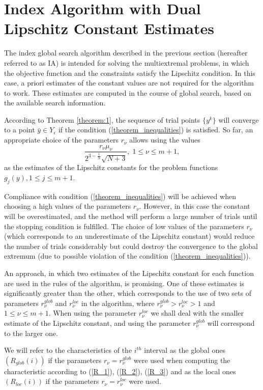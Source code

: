 \documentclass[twocolumn]{svjour3}          %
\begin{document}
\section{Index Algorithm with Dual Lipschitz Constant Estimates}
\label{sec:4}
	The index global search algorithm described in the previous section (hereafter referred to as IA) is intended for solving  the multiextremal problems, in which the objective function and the constraints satisfy the Lipschitz condition.  In this case, a priori estimates of the constant values are not required for the algorithm to work. These estimates are computed in the course of global search, based on the available search information. 
	
	According to Theorem \ref{theorem:1}, the sequence of trial points $\{y^k\}$ will converge to a point $\bar y \in Y_\epsilon$ if the condition (\ref{theorem_inequalities}) is satisfied. So far, an appropriate choice of the parameters $r_{\nu}$ allows using the values
\begin{equation}\label{estimates_Lipschitz_constants}
	\frac{r_{\nu}\mu_{\nu}}{2^{3-\frac{1}{N}}\sqrt{N+3}}, \; 1 \leq \nu \leq m+1, 
\end{equation}
as the estimates of the Lipschitz constants for the problem functions $g_{j}(y), 1 \leq j \leq m+1$.

	Compliance with condition (\ref{theorem_inequalities}) will be achieved when choosing a high values of the parameters $r_{\nu}$. However, in this case the constant will be overestimated, and the method will perform a large number of trials until the stopping condition is fulfilled.
	The choice of low values of the parameters $r_{\nu}$ (which corresponds to an underestimate of the Lipschitz constant) would reduce the number of trials considerably but could destroy the convergence to the global extremum (due to possible violation of the condition (\ref{theorem_inequalities})).
	
	An approach, in which two estimates of the Lipschitz constant for each function are used in the rules of the algorithm, is promising. One of these estimates is significantly greater than the other, which corresponds to the use of two sets of parameters $r_{\nu}^{glob}$ and $r_{\nu}^{loc}$ in the algorithm, where $r_{\nu}^{glob}>r_{\nu}^{loc}>1$ and $1 \leq \nu \leq m+1$. When using the parameter $r_{\nu}^{loc}$ we shall deal with the smaller estimate of the Lipschitz constant, and using the parameter $r_{\nu}^{glob}$ will correspond to the larger one.
	
	We will refer to the characteristics of the $i^{th}$ interval as the global ones $(R_{glob}(i))$ if the parameters $r_{\nu}=r_{\nu}^{glob}$ were used when computing the characteristic according to (\ref{R_1}), (\ref{R_2}), (\ref{R_3}) and as the local ones  $(R_{loc}(i))$ if the parameters $r_{\nu}=r_{\nu}^{loc}$ were used. 
\end{document}
